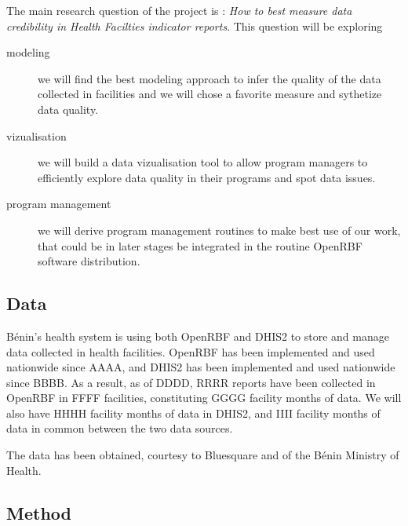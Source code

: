 The main research question of the project is : \textit{How to best measure data credibility in Health Facilties indicator reports}. This question will be exploring

\begin{description}
	\item[modeling] we will find the best modeling approach to infer the quality of the data collected in facilities and we will chose a favorite measure and sythetize data quality.
	\item[vizualisation] we will build a data vizualisation tool to allow program managers to efficiently explore data quality in their programs and spot data issues.
	\item[program management] we will derive program management routines to make best use of our work, that could be in later stages be integrated in the routine OpenRBF software distribution.
\end{description}

\subsection{Data}
\label{paper2_data}

Bénin's health system is using both OpenRBF and DHIS2 to store and manage data collected in health facilities. OpenRBF has been implemented and used nationwide since AAAA, and DHIS2 has been implemented and used nationwide since BBBB. As a result, as of DDDD, RRRR reports have been collected in OpenRBF in FFFF facilities, constituting GGGG facility months of data. We will also have HHHH facility months of data in DHIS2, and IIII facility months of data in common between the two data sources.

The data has been obtained, courtesy to Bluesquare and of the Bénin Ministry of Health.

\subsection{Method}


